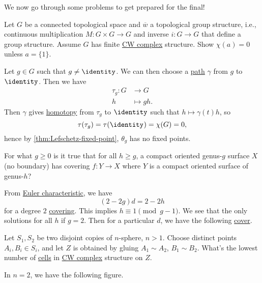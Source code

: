 We now go through some problems to get prepared for the final!
\begin{exercise}[QR Jan. 2021]
	Let \(G\) be a connected topological space and \(\overline{w} \) a topological group structure, i.e., continuous multiplication
	\(M\colon G\times G \to G\) and inverse \(i\colon G\to G\) that define a group structure. Assume \(G\) has finite \hyperref[def:CW-Complex]{CW complex}
	structure. Show \(\chi (a) = 0\) unless \(a = \{1\}\).
\end{exercise}
\begin{answer}
	Let \(g\in G\) such that \(g \neq \identity_{} \). We can then choose a \hyperref[def:path]{path} \(\gamma \) from \(g\) to \(\identity_{} \).
	Then we have
	\[
		\begin{split}
			\tau _g\colon G &\to G\\
			h &\mapsto gh.
		\end{split}
	\]
	Then \(\gamma \) gives \hyperref[def:homotopy]{homotopy} from \(\tau _g\) to \(\identity_{} \) such that \(h \mapsto \gamma (t) h\),
	so
	\[
		\tau (\tau _{g} )= \tau (\identity_{} )= \chi (G) = 0,
	\]
	hence by \autoref{thm:Lefschetz-fixed-point}, \(\theta _g\) has no fixed points.
\end{answer}

\begin{exercise}[QR May 2019]
	For what \(g \geq 0\) is it true that for all \(h \geq g\), a compact oriented genus-\(g\) surface \(X\) (no boundary)
	has covering \(f\colon Y\to X\) where \(Y\) is a compact oriented surface of genus-\(h\)?
\end{exercise}
\begin{answer}
	From \hyperref[def:Euler-characteristic]{Euler characteristic}, we have
	\[
		(2 - 2g) d = 2 - 2h
	\]
	for a degree \(2\) \hyperref[def:covering-space]{covering}. This implies \(h \equiv 1\pmod {g-1}\). We see that the only solutions
	for all \(h\) if \(g = 2\). Then for a particular \(d\), we have the following \hyperref[def:covering-space]{cover}.
	\begin{figure}[H]
		\centering
		\label{fig:lec-41-2}
	\end{figure}
\end{answer}

\begin{exercise}[QR Jan. 2019]
	Let \(S_1, S_2\) be two disjoint  copies of \(n\)-sphere, \(n>1\). Choose distinct points \(A_{i} , B_{i} \in S_{i} \), and let
	\(Z\) is obtained by gluing \(A_1\sim A_2\), \(B_1\sim B_2\). What's the lowest number of \hyperref[def:cell]{cells} in
	\hyperref[def:CW-Complex]{CW complex} structure on \(Z\).
\end{exercise}
\begin{answer}
	In \(n=2\), we have the following figure.
	\begin{figure}[H]
		\centering
		\label{fig:lec-41-3}
	\end{figure}
\end{answer}

